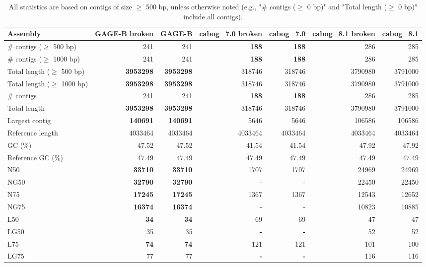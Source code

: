 \documentclass[12pt,a4paper]{article}
\begin{document}
\begin{table}[ht]
\begin{center}
\caption{All statistics are based on contigs of size $\geq$ 500 bp, unless otherwise noted (e.g., "\# contigs ($\geq$ 0 bp)" and "Total length ($\geq$ 0 bp)" include all contigs).}
\begin{tabular}{|l*{6}{|r}|}
\hline
Assembly & GAGE-B broken & GAGE-B & cabog\_7.0 broken & cabog\_7.0 & cabog\_8.1 broken & cabog\_8.1 \\ \hline
\# contigs ($\geq$ 500 bp) & 241 & 241 & {\bf 188} & {\bf 188} & 286 & 285 \\ \hline
\# contigs ($\geq$ 1000 bp) & 241 & 241 & {\bf 188} & {\bf 188} & 286 & 285 \\ \hline
Total length ($\geq$ 500 bp) & {\bf 3953298} & {\bf 3953298} & 318746 & 318746 & 3790980 & 3791000 \\ \hline
Total length ($\geq$ 1000 bp) & {\bf 3953298} & {\bf 3953298} & 318746 & 318746 & 3790980 & 3791000 \\ \hline
\# contigs & 241 & 241 & {\bf 188} & {\bf 188} & 286 & 285 \\ \hline
Total length & {\bf 3953298} & {\bf 3953298} & 318746 & 318746 & 3790980 & 3791000 \\ \hline
Largest contig & {\bf 140691} & {\bf 140691} & 5646 & 5646 & 106586 & 106586 \\ \hline
Reference length & 4033464 & 4033464 & 4033464 & 4033464 & 4033464 & 4033464 \\ \hline
GC (\%) & 47.52 & 47.52 & 41.54 & 41.54 & 47.92 & 47.92 \\ \hline
Reference GC (\%) & 47.49 & 47.49 & 47.49 & 47.49 & 47.49 & 47.49 \\ \hline
N50 & {\bf 33710} & {\bf 33710} & 1707 & 1707 & 24969 & 24969 \\ \hline
NG50 & {\bf 32790} & {\bf 32790} & - & - & 22450 & 22450 \\ \hline
N75 & {\bf 17245} & {\bf 17245} & 1367 & 1367 & 12543 & 12652 \\ \hline
NG75 & {\bf 16374} & {\bf 16374} & - & - & 10823 & 10885 \\ \hline
L50 & {\bf 34} & {\bf 34} & 69 & 69 & 47 & 47 \\ \hline
LG50 & 35 & 35 & {\bf -} & {\bf -} & 52 & 52 \\ \hline
L75 & {\bf 74} & {\bf 74} & 121 & 121 & 101 & 100 \\ \hline
LG75 & 77 & 77 & {\bf -} & {\bf -} & 116 & 116 \\ \hline

\end{tabular}
\end{center}
\end{table}
\end{document}

